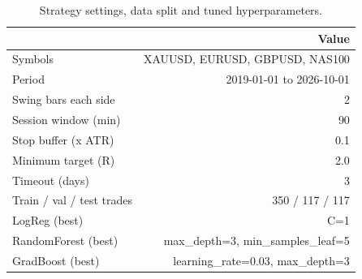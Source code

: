 \begin{table}[h]
\centering
\caption{Strategy settings, data split and tuned hyperparameters.}
\label{tab:table1_settings}
\small
\begin{tabular}{lr}
\hline
 & Value \\
\hline
Symbols & XAUUSD, EURUSD, GBPUSD, NAS100 \\
Period & 2019-01-01 to 2026-10-01 \\
Swing bars each side & 2 \\
Session window (min) & 90 \\
Stop buffer (x ATR) & 0.1 \\
Minimum target (R) & 2.0 \\
Timeout (days) & 3 \\
Train / val / test trades & 350 / 117 / 117 \\
LogReg (best) & C=1 \\
RandomForest (best) & max\_depth=3, min\_samples\_leaf=5 \\
GradBoost (best) & learning\_rate=0.03, max\_depth=3 \\
\hline
\end{tabular}
\end{table}